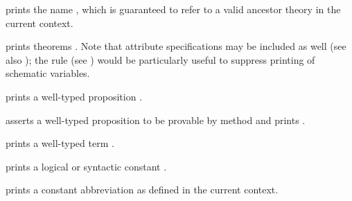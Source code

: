\begin{isabellebody}
\begin{isamarkuptext}
  \begin{descr}
  
  \item [\isa{{\isachardoublequote}{\isacharat}{\isacharbraceleft}theory\ A{\isacharbraceright}{\isachardoublequote}}] prints the name , which is
  guaranteed to refer to a valid ancestor theory in the current
  context.

  \item [\isa{{\isachardoublequote}{\isacharat}{\isacharbraceleft}thm\ a\isactrlsub {\isadigit{1}}\ {\isasymdots}\ a\isactrlsub n{\isacharbraceright}{\isachardoublequote}}] prints theorems
  .  Note that attribute specifications
  may be included as well (see also ); the
  \hyperlink{attribute.no-vars}{\mbox{}} rule (see ) would
  be particularly useful to suppress printing of schematic variables.

  \item [\isa{{\isachardoublequote}{\isacharat}{\isacharbraceleft}prop\ {\isasymphi}{\isacharbraceright}{\isachardoublequote}}] prints a well-typed proposition \isa{{\isachardoublequote}{\isasymphi}{\isachardoublequote}}.

  \item [\isa{{\isachardoublequote}{\isacharat}{\isacharbraceleft}lemma\ {\isasymphi}\ by\ m{\isacharbraceright}{\isachardoublequote}}] asserts a well-typed proposition \isa{{\isachardoublequote}{\isasymphi}{\isachardoublequote}} to be provable by method  and prints \isa{{\isachardoublequote}{\isasymphi}{\isachardoublequote}}.

  \item [\isa{{\isachardoublequote}{\isacharat}{\isacharbraceleft}term\ t{\isacharbraceright}{\isachardoublequote}}] prints a well-typed term .

  \item [\isa{{\isachardoublequote}{\isacharat}{\isacharbraceleft}const\ c{\isacharbraceright}{\isachardoublequote}}] prints a logical or syntactic constant
  .
  
  \item [\isa{{\isachardoublequote}{\isacharat}{\isacharbraceleft}abbrev\ c\ x\isactrlsub {\isadigit{1}}\ {\isasymdots}\ x\isactrlsub n{\isacharbraceright}{\isachardoublequote}}] prints a constant
  abbreviation  as defined in
  the current context.


\end{descr}
\end{isamarkuptext}
\end{isabellebody}
